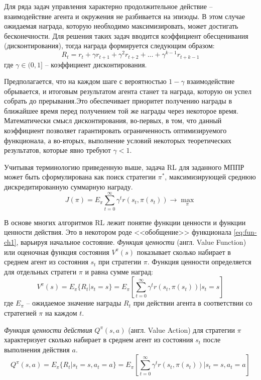 Для ряда задач управления характерно продолжительное действие -- взаимодействие агента и окружения не разбивается на эпизоды. В этом случае ожидаемая награда, которую необходимо максимизировать, может достигать бесконечности. Для решения таких задач вводится коэффициент обесценивания (дисконтирования), тогда награда формируется следующим образом:
\begin{equation*}
R_t = r_t + \gamma r_{t+1} + \gamma^2 r_{t+2} + ... + \gamma ^{k-1} r_{t+k-1}
\end{equation*}
где $\gamma \in (0, 1]$ -- коэффициент дисконтирования.

Предполагается, что на каждом шаге с вероятностью $1-\gamma$ взаимодействие обрывается, и итоговым результатом агента станет та награда, которую он успел собрать до прерывания.Это обеспечивает приоритет получению награды в ближайшее время перед получением той же награды через некоторое время. Математически смысл дисконтирования, во-первых, в том, что данный коэффициент позволяет гарантировать ограниченность оптимизируемого функционала, а во-вторых, выполнение условий некоторых теоретических результатов, которые явно требуют $\gamma < 1$.

Учитывая терминологию приведенную выше, задача RL для заданного МППР может быть сформулирована как поиск стратегии $\pi^*$, максимизирующей среднюю дискредитированную суммарную награду. 
\begin{equation}
\label{eq:fun-ch1}
J(\pi) = E_{\pi}\sum_{t=0}^{\infty}\gamma^{t}r(s_t, \pi(s_t)) \rightarrow \max_{\pi}
\end{equation}


В основе многих алгоритмов RL лежит понятие функции ценности и функции ценности действия. Это в некотором роде <<обобщение>> функционала \ref{eq:fun-ch1}, варьируя начальное состояние. \textit{Функция ценности} (англ. Value Function) или оценочная функция состояния $V^{\pi}(s)$ показывает сколько набирает в среднем агент из состояния $s_t$ при стратегии $\pi$. Функция ценности определяется для отдельных стратеги $\pi$ и равна сумме наград:
\begin{equation}
\label{eq:val-ch1}
V^{\pi}(s) = E_{\pi}\{R_t | s_t = s\} = E_{\pi} \left[\sum_{t=0}^{\infty}\gamma^{t}r(s_t, \pi(s_t))\Bigg|s_t = s \right]
\end{equation}
где $E_{\pi}$ -- ожидаемое значение награды $R_t$ при действии агента в соответствии со стратегией $\pi$ на каждом $t$.

\textit{Функция ценности действия} $Q^{\pi}(s, a)$ (англ. Value Action) для стратегии $\pi$ характеризует сколько набирает в среднем агент из состояния $s_t$ после выполнения действия $a$. 
\begin{equation*}
Q^{\pi}(s, a) = E_{\pi}\{R_t | s_t = s, a_t = a\} = E_{\pi}\left[\sum_{t=0}^{\infty}\gamma^{t}r(s_t, \pi(s_t))\Bigg|s_t = s, a_t = a\right]
\end{equation*}

